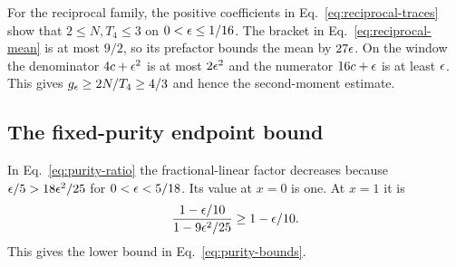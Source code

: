For the reciprocal family, the positive coefficients in
Eq.~\eqref{eq:reciprocal-traces} show that $2\le N,T_4\le3$ on
$0<\epsilon\le1/16$. The bracket in Eq.~\eqref{eq:reciprocal-mean} is at
most $9/2$, so its prefactor bounds the mean by $27\epsilon$.
On the window the denominator $4c+\epsilon^2$ is at most $2\epsilon^2$
and the numerator $16c+\epsilon$ is at least $\epsilon$. This gives
$g_\epsilon\ge2N/T_4\ge4/3$ and hence the second-moment estimate.

\subsection{The fixed-purity endpoint bound}
In Eq.~\eqref{eq:purity-ratio} the fractional-linear factor decreases
because $\epsilon/5>18\epsilon^2/25$ for $0<\epsilon<5/18$. Its value at
$x=0$ is one. At $x=1$ it is
\begin{equation}\label{eq:purity-endpoint}
 \frac{1-\epsilon/10}{1-9\epsilon^2/25}\ge1-\epsilon/10.
\end{equation}
This gives the lower bound in Eq.~\eqref{eq:purity-bounds}.
